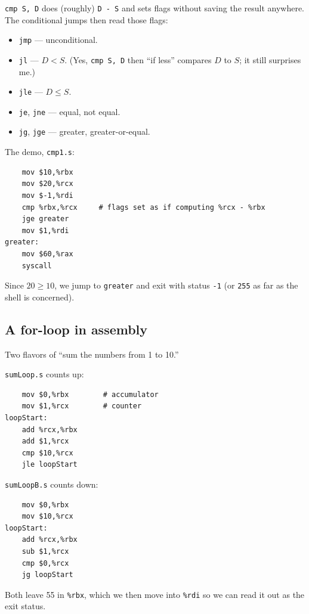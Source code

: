 \documentclass[11pt]{article}
\begin{document}
\texttt{cmp S, D} does (roughly) \texttt{D - S} and sets flags without
saving the result anywhere. The conditional jumps then read those
flags:

\begin{itemize}
  \item \texttt{jmp} --- unconditional.
  \item \texttt{jl} --- $D < S$. (Yes, \texttt{cmp S, D} then ``if
    less'' compares $D$ to $S$; it still surprises me.)
  \item \texttt{jle} --- $D \le S$.
  \item \texttt{je}, \texttt{jne} --- equal, not equal.
  \item \texttt{jg}, \texttt{jge} --- greater, greater-or-equal.
\end{itemize}

The demo, \texttt{cmp1.s}:

\begin{lstlisting}
    mov $10,%rbx
    mov $20,%rcx
    mov $-1,%rdi
    cmp %rbx,%rcx     # flags set as if computing %rcx - %rbx
    jge greater
    mov $1,%rdi
greater:
    mov $60,%rax
    syscall
\end{lstlisting}

Since $20 \ge 10$, we jump to \texttt{greater} and exit with status
\texttt{-1} (or \texttt{255} as far as the shell is concerned).

\subsection*{A for-loop in assembly}

Two flavors of ``sum the numbers from 1 to 10.''

\texttt{sumLoop.s} counts up:

\begin{lstlisting}
    mov $0,%rbx        # accumulator
    mov $1,%rcx        # counter
loopStart:
    add %rcx,%rbx
    add $1,%rcx
    cmp $10,%rcx
    jle loopStart
\end{lstlisting}

\texttt{sumLoopB.s} counts down:

\begin{lstlisting}
    mov $0,%rbx
    mov $10,%rcx
loopStart:
    add %rcx,%rbx
    sub $1,%rcx
    cmp $0,%rcx
    jg loopStart
\end{lstlisting}

Both leave 55 in \texttt{\%rbx}, which we then move into
\texttt{\%rdi} so we can read it out as the exit status.
\end{document}
